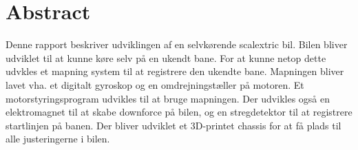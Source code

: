 \section{Abstract}
Denne rapport beskriver udviklingen af en selvkørende scalextric bil. Bilen bliver udviklet til at kunne køre selv på en ukendt bane. For at kunne netop dette udvkles et mapning system til at registrere den ukendte bane. Mapningen bliver lavet vha. et digitalt gyroskop og en omdrejningstæller på motoren. Et motorstyringsprogram udvikles til at bruge mapningen. Der udvikles også en elektromagnet til at skabe downforce på bilen, og en stregdetektor til at registrere startlinjen på banen. Der bliver udviklet et 3D-printet chassis for at få plads til alle justeringerne i bilen.